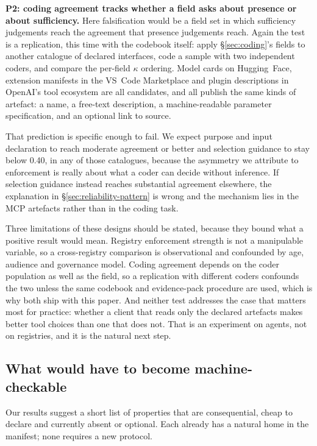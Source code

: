 \documentclass[a4paper,fleqn]{cas-dc}
\begin{document}
\textbf{P2: coding agreement tracks whether a field asks about presence or about
sufficiency.} Here falsification would be a field set in which sufficiency
judgements reach the agreement that presence judgements reach. Again the test is
a replication, this time with the codebook itself: apply \S\ref{sec:coding}'s
fields to another catalogue of declared interfaces, code a sample with two
independent coders, and compare the per-field $\kappa$ ordering. Model cards on
Hugging~Face, extension manifests in the VS~Code Marketplace and plugin
descriptions in OpenAI's tool ecosystem are all candidates, and all publish the
same kinds of artefact: a name, a free-text description, a machine-readable
parameter specification, and an optional link to source.

That prediction is specific enough to fail. We expect purpose and input
declaration to reach moderate agreement or better and selection guidance to
stay below 0.40, in any of those catalogues, because the asymmetry we attribute
to enforcement is really about what a coder can decide without inference. If
selection guidance instead reaches substantial agreement elsewhere, the
explanation in \S\ref{sec:reliability-pattern} is wrong and the mechanism lies
in the MCP artefacts rather than in the coding task.

Three limitations of these designs should be stated, because they bound what a
positive result would mean. Registry enforcement strength is not a manipulable
variable, so a cross-registry comparison is observational and confounded by age,
audience and governance model. Coding agreement depends on the coder population
as well as the field, so a replication with different coders confounds the two
unless the same codebook and evidence-pack procedure are used, which is why both
ship with this paper. And neither test addresses the case that matters most for
practice: whether a client that reads only the declared artefacts makes better
tool choices than one that does not. That is an experiment on agents, not on
registries, and it is the natural next step.

\subsection{What would have to become machine-checkable}

Our results suggest a short list of properties that are consequential, cheap to
declare and currently absent or optional. Each already has a natural home in
the manifest; none requires a new protocol.
\end{document}
